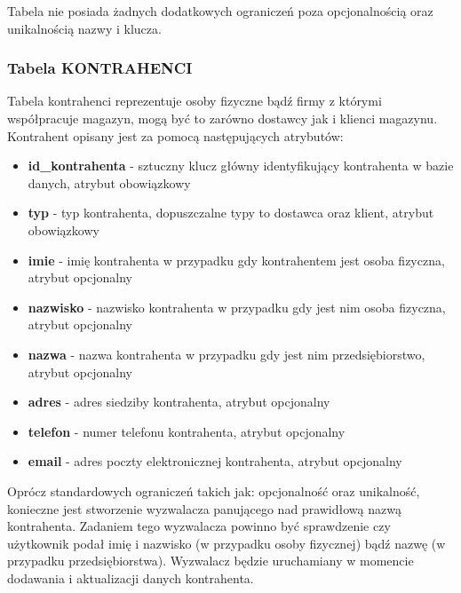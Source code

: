 Tabela nie posiada żadnych dodatkowych ograniczeń poza opcjonalnością oraz
unikalnością nazwy i klucza.

\subsubsection{Tabela KONTRAHENCI}
Tabela kontrahenci reprezentuje osoby fizyczne bądź firmy z którymi
współpracuje magazyn, mogą być to zarówno dostawcy jak i klienci magazynu. Kontrahent opisany
jest za pomocą następujących atrybutów:
\begin{itemize}
  \item \textbf{id\_kontrahenta} - sztuczny klucz główny identyfikujący
  kontrahenta w bazie danych, atrybut obowiązkowy
  \item \textbf{typ} - typ kontrahenta, dopuszczalne typy to dostawca oraz
  klient, atrybut obowiązkowy
  \item \textbf{imie} - imię kontrahenta w przypadku gdy kontrahentem jest osoba
  fizyczna, atrybut opcjonalny
  \item \textbf{nazwisko} - nazwisko kontrahenta w przypadku gdy jest nim osoba
  fizyczna, atrybut opcjonalny
  \item \textbf{nazwa} - nazwa kontrahenta w przypadku gdy jest nim
  przedsiębiorstwo, atrybut opcjonalny 
  \item \textbf{adres} - adres siedziby kontrahenta, atrybut opcjonalny
  \item \textbf{telefon} - numer telefonu kontrahenta, atrybut opcjonalny
  \item \textbf{email} - adres poczty elektronicznej kontrahenta, atrybut
  opcjonalny
\end{itemize}

Oprócz standardowych ograniczeń takich jak: opcjonalność oraz unikalność,
konieczne jest stworzenie wyzwalacza panującego nad prawidłową nazwą
kontrahenta. Zadaniem tego wyzwalacza powinno być sprawdzenie czy użytkownik
podał imię i nazwisko (w przypadku osoby fizycznej) bądź nazwę (w przypadku
przedsiębiorstwa). Wyzwalacz będzie uruchamiany w momencie dodawania i aktualizacji danych kontrahenta.

